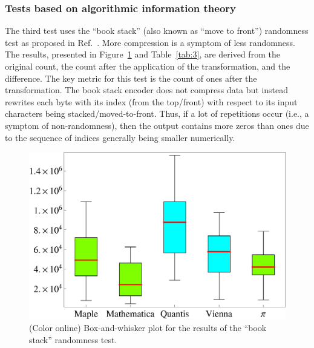 \documentclass[%
 preprint,
 showpacs,
 showkeys,
 preprintnumbers,
 amsmath,amssymb,
 aps,
 prl,
  longbibliography,
 ]{revtex4-1}
\begin{document}
\subsubsection{Tests based on algorithmic information theory}

The third test
uses  the ``book stack'' (also known as ``move to front'') randomness
test as proposed in Ref.~\cite{MR2099021,MR2162569}.
More compression is a symptom of less randomness.
The results, presented in
Figure~\ref{fig:example3} and Table~\ref{tab:3}, are derived from the original count, the count after the application
of the transformation, and the difference.  The key metric for this test is
the count of ones after the transformation.  The book stack encoder does
not compress data but instead rewrites each byte with its index (from
the top/front) with respect to its input characters being
stacked/moved-to-front.
Thus, if a lot of repetitions occur (i.e., a symptom of
non-randomness), then the output  contains more zeros than ones due to
the sequence of indices generally being smaller numerically.

\begin{figure}[htbp] %
   \centering
   \includegraphics[width=6in]{2009-QvPR-boxbookstack}
   \caption{(Color online) Box-and-whisker plot for the results of  the ``book stack'' randomness test.}
   \label{fig:example3}
\end{figure}
\end{document}
